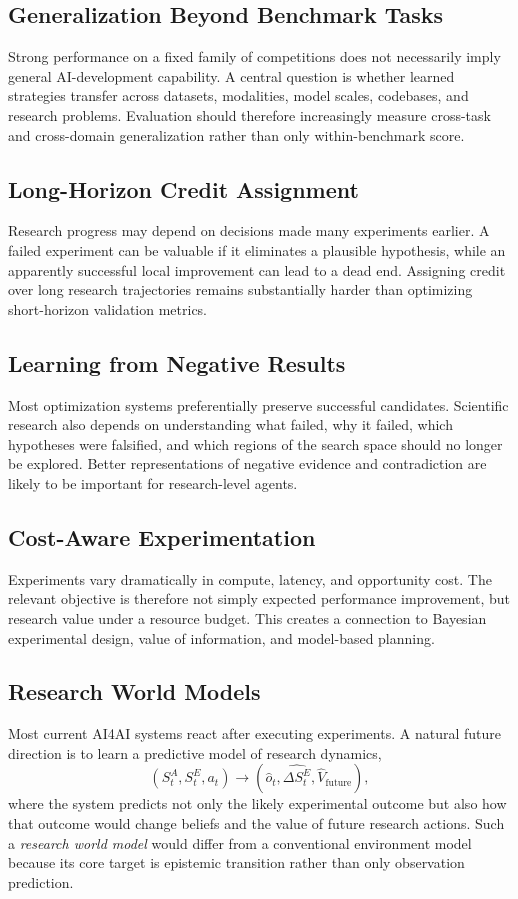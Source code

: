 \documentclass[journal]{IEEEtran}
\begin{document}
\subsection{Generalization Beyond Benchmark Tasks}
Strong performance on a fixed family of competitions does not necessarily imply general AI-development capability. A central question is whether learned strategies transfer across datasets, modalities, model scales, codebases, and research problems. Evaluation should therefore increasingly measure cross-task and cross-domain generalization rather than only within-benchmark score.

\subsection{Long-Horizon Credit Assignment}
Research progress may depend on decisions made many experiments earlier. A failed experiment can be valuable if it eliminates a plausible hypothesis, while an apparently successful local improvement can lead to a dead end. Assigning credit over long research trajectories remains substantially harder than optimizing short-horizon validation metrics.

\subsection{Learning from Negative Results}
Most optimization systems preferentially preserve successful candidates. Scientific research also depends on understanding what failed, why it failed, which hypotheses were falsified, and which regions of the search space should no longer be explored. Better representations of negative evidence and contradiction are likely to be important for research-level agents.

\subsection{Cost-Aware Experimentation}
Experiments vary dramatically in compute, latency, and opportunity cost. The relevant objective is therefore not simply expected performance improvement, but research value under a resource budget. This creates a connection to Bayesian experimental design, value of information, and model-based planning.

\subsection{Research World Models}
Most current AI4AI systems react after executing experiments. A natural future direction is to learn a predictive model of research dynamics,
\begin{equation}
(S_t^{A},S_t^{E},a_t)\rightarrow(\hat{o}_t,\widehat{\Delta S_t^{E}},\hat{V}_{\mathrm{future}}),
\end{equation}
where the system predicts not only the likely experimental outcome but also how that outcome would change beliefs and the value of future research actions. Such a \emph{research world model} would differ from a conventional environment model because its core target is epistemic transition rather than only observation prediction.
\end{document}
